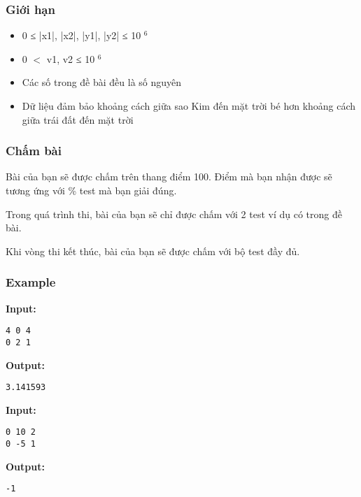 \subsubsection{   Giới hạn  }
\begin{itemize}
	\item     0 ≤ |x1|, |x2|, |y1|, |y2| ≤ 10    $^     6    $
	\item     0 $<$ v1, v2 ≤ 10    $^     6    $
	\item     Các số trong đề bài đều là số nguyên   
	\item      Dữ liệu đảm bảo khoảng cách giữa sao Kim đến mặt trời bé hơn khoảng cách giữa trái đất đến mặt trời    
\end{itemize}

\subsubsection{   Chấm bài  }

   Bài của bạn sẽ được chấm trên thang điểm 100. Điểm mà bạn nhận được sẽ tương ứng với \% test mà bạn giải đúng.  

   Trong quá trình thi, bài của bạn sẽ chỉ được chấm với 2 test ví dụ có trong đề bài.  

   Khi vòng thi kết thúc, bài của bạn sẽ được chấm với bộ test đầy đủ.  
\begin{itemize}
\end{itemize}

\subsubsection{   Example  }

\textbf{    Input:   }
\begin{verbatim}
4 0 4
0 2 1\end{verbatim}

\textbf{    Output:   }
\begin{verbatim}
3.141593

\end{verbatim}



\textbf{    Input:   }
\begin{verbatim}
0 10 2
0 -5 1\end{verbatim}

\textbf{    Output:   }
\begin{verbatim}
-1\end{verbatim}